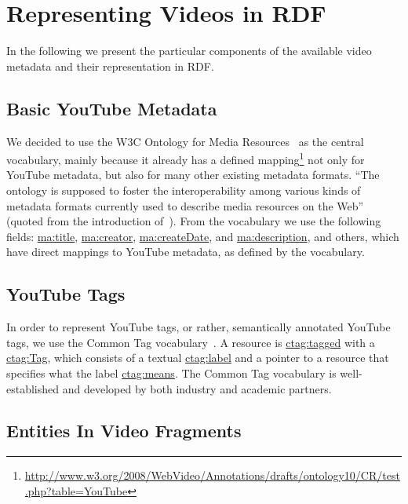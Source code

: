 \documentclass{acm_proc_article-sp}
\begin{document}
\section{Representing Videos in RDF}\label{sec:representing}
In the following we present the particular components of the available video metadata and their representation in RDF.

\subsection{Basic YouTube Metadata}\label{sec:metadata}
We decided to use the W3C Ontology for Media Resources~\cite{W3C:MediaOntology} as the central vocabulary, mainly because it already has a defined mapping\footnote{\url{http://www.w3.org/2008/WebVideo/Annotations/drafts/ontology10/CR/test.php?table=YouTube}} not only for YouTube metadata, but also for many other existing metadata formats. ``The ontology is supposed to foster the interoperability among various kinds of metadata formats currently used to describe media resources on the Web'' (quoted from the introduction of~\cite{W3C:MediaOntology}). From the vocabulary we use the following fields: \url{ma:title}, \url{ma:creator}, \url{ma:createDate}, and \url{ma:description}, and others, which have direct mappings to YouTube metadata, as defined by the vocabulary.

\subsection{YouTube Tags}\label{sec:youtube}
In order to represent YouTube tags, or rather, semantically annotated YouTube tags, we use the Common Tag vocabulary~\cite{CommonTag:Spec}. A resource is \url{ctag:tagged} with a \url{ctag:Tag}, which consists of a textual \url{ctag:label} and a pointer to a resource that specifies what the label \url{ctag:means}. The Common Tag vocabulary is well-established and developed by both industry and academic partners.

\subsection{Entities In Video Fragments}
\end{document}
